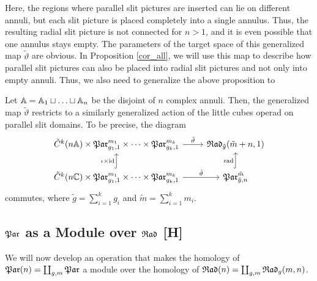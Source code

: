 Here, the regions where parallel slit pictures are inserted can lie on different annuli, but each slit picture is placed completely into a single annulus.
Thus, the resulting radial slit picture is not connected for $n > 1$, and it is even possible that one annulus stays empty.
The parameters of the target space of this generalized map $\tilde \vartheta$ are obvious.
In Proposition \ref{cor_all}, we will use this map to describe how parallel slit pictures can also be placed into radial slit pictures and not only into empty annuli.
Thus, we also need to generalize the above proposition to

\begin{prop}
\label{rad_par_operad_gen}
    Let $\mathbb A = \mathbb A_1 \sqcup \dotsc \sqcup \mathbb A_n$ be the disjoint of $n$ complex annuli.
    Then, the generalized map $\tilde \vartheta$ restricts to a similarly generalized action of the little cubes operad on parallel slit domains.
    To be precise, the diagram
    \[
    \begin{tikzcd}
       \tilde C^k(n\A) \times \mathfrak{Par}_{g_1, 1}^{m_1} \times \dotsb \times \mathfrak{Par}_{g_k, 1}^{m_k} \arrow{r}{\tilde \vartheta} & \Radt_{\tilde g}(\tilde m + n, 1) \\
       \tilde C^k(n\C) \times \mathfrak{Par}_{g_1, 1}^{m_1} \times \dotsb \times \mathfrak{Par}_{g_k, 1}^{m_k} \arrow{r}{\tilde \vartheta} \arrow[hookrightarrow]{u}{\iota \times \text{id}} & \mathfrak{Par}_{\tilde g, n}^{\tilde m} \arrow[hookrightarrow]{u}{\radmap}
    \end{tikzcd}
   \]
   commutes, where $\tilde g = \sum_{i = 1}^{k} g_i$ and $\tilde m = \sum_{i = 1}^k m_i$. 
\end{prop}

\subsection{\texorpdfstring{$\mathfrak{Par}$}{Par} as a Module over \texorpdfstring{$\mathfrak{Rad}$}{Rad} [H]}
\label{par_as_rad_module}

We will now develop an operation that makes the homology of $\mathfrak{Par}(n) = \coprod_{g, m} \mathfrak{Par}$ a module over the homology of $\mathfrak{Rad}(n) = \coprod_{g, m} {\mathfrak{Rad}_g(m,n)}$.

